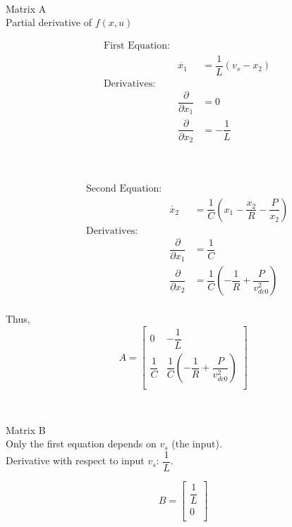 \documentclass[12pt]{article}
\begin{document}
\

\begin{tcolorbox}[enhanced, frame hidden, colback=white, borderline west={1pt}{0pt}{gray}]
  \large{Matrix A}\\
  \normalsize{}
  Partial derivative of $f(x, u)$\\
  \begin{minipage}{0.4\textwidth}
    \begin{align*}
      &\text{First Equation:} &\\
      &&\dot{x_1} &= \dfrac{1}{L}(v_s - x_2)\\
      &\text{Derivatives:}&\\
      &&\dfrac{\partial}{\partial x_1} &= 0\\
      &&\dfrac{\partial}{\partial x_2} &= -\dfrac{1}{L}\\
    \end{align*}
  \end{minipage}
  \begin{minipage}{0.04\textwidth}
    \
  \end{minipage}
  \begin{minipage}{0.4\textwidth}
    \begin{align*}
      &\text{Second Equation:} &\\
      &&\dot{x_2} &= \dfrac{1}{C}(x_1 - \dfrac{x_2}{R} - \dfrac{P}{x_2})\\
      &\text{Derivatives:}&\\
      &&\dfrac{\partial}{\partial x_1} &= \dfrac{1}{C}\\
      &&\dfrac{\partial}{\partial x_2} &= \dfrac{1}{C}(-\dfrac{1}{R} + \dfrac{P}{v^2_{dc0}})\\
    \end{align*}
  \end{minipage}
  Thus,\\
  \[
    \boxed{
      A =
      \begin{bmatrix}
        0 & -\dfrac{1}{L}\\
        \dfrac{1}{C} & \dfrac{1}{C}(-\dfrac{1}{R} + \dfrac{P}{v^2_{dc0}})\\
      \end{bmatrix}
    }
  \]
  
  \      

  \large{Matrix B}\\
  \normalsize{}
  Only the first equation depends on $v_s$ (the input).\\
  Derivative with respect to input $v_s$: $\dfrac{1}{L}$.

  \[
    \boxed{
      B =
      \begin{bmatrix}
        \dfrac{1}{L}\\
        0\\
      \end{bmatrix}
    }
  \]
\end{tcolorbox}
\end{document}
